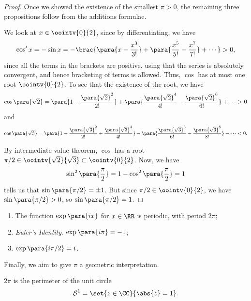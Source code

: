 \begin{proof}
    Once we showed the existence of the smallest \(\pi > 0\), the remaining three propositions follow from the additions formulae.

    We look at \(x \in \oointv{0}{2}\), since by differentiating, we have
    \[
        \cos' x = - \sin x = - \brac{\para{x - \frac{x^3}{3!}} + \para{\frac{x^5}{5!} - \frac{x^7}{7!}} + \cdots} > 0,
    \]
    since all the terms in the brackets are positive, using that the series is absolutely convergent, and hence bracketing of terms is allowed. Thus, \(\cos\) has at most one root \(\oointv{0}{2}\). To see that the existence of the root, we have
    \[
        \cos \para{\sqrt{2}} = \para{1 - \frac{\para{\sqrt{2}}^2}{2!}} + \para{\frac{\para{\sqrt{2}}^4}{4!} - \frac{\para{\sqrt{2}}^6}{6!}} + \cdots > 0
    \]
    and
    \[
        \cos \para{\sqrt{3}} = \para{1 - \frac{\para{\sqrt{3}}^2}{2!} + \frac{\para{\sqrt{3}}^4}{4!}} - \para{\frac{\para{\sqrt{3}}^6}{6!} - \frac{\para{\sqrt{3}}^8}{8!}} - \cdots < 0.
    \]
    
    By intermediate value theorem, \(\cos\) has a root \(\pi / 2 \in \oointv{\sqrt{2}}{\sqrt{3}} \subset \oointv{0}{2}\). Now, we have
    \[
        \sin^2\para{\frac{\pi}{2}} = 1 - \cos^2 \para{\frac{\pi}{2}} = 1
    \]
    tells us that \(\sin \para{\pi / 2} = \pm 1\). But since \(\pi / 2 \in \oointv{0}{2}\), we have \(\sin \para{\pi / 2} > 0\), so \(\sin \para{\pi / 2} = 1\).
\end{proof}

\begin{corollary}
    \label{cor:properties-complex-exponentials}%
    \begin{enumerate}
        \item The function \(\exp \para{ix}\) for \(x \in \RR\) is periodic, with period \(2 \pi\);
        \item \emph{Euler's Identity}. \(\exp \para{i \pi} = -1\);
        \item \(\exp \para{i \pi / 2} = i\).
    \end{enumerate}
\end{corollary}

Finally, we aim to give \(\pi\) a geometric interpretation.

\begin{lemma}
    \label{lem:perimeter-unit-circle}%
    \(2\pi\) is the perimeter of the unit circle
    \[
        \mathcal{S}^1 = \set{z \in \CC}{\abs{z} = 1}.
    \]
\end{lemma}

